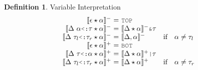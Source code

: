 \documentclass[acmsmall]{acmart}
\theoremstyle{definition}
\newtheorem{definition}{Definition}[section]
\begin{document}


\begin{definition} 
  \label{def:variable_interpretation}
  Variable Interpretation
  \hfill
  \boxed{
    \llbracket\Delta \star \alpha \rrbracket^\pm = \tau
  }
  \\
  \[
  \begin{array}[t]{r@{}c@{}lcl}

      \llbracket \epsilon \star \alpha \rrbracket^-
      &\ =\ & 
      \J{TOP}

      \\

      \llbracket \Delta \ \alpha  \J{<:} \tau \star \alpha \rrbracket^- 
      &\ =\ & 
      \llbracket \Delta \star \alpha \rrbracket^- \J{\&} \tau

      \\

      \llbracket \Delta \ \tau_l \J{<:} \tau_r \star \alpha \rrbracket^- 
      &\ =\ & 
      \llbracket \Delta, \alpha \rrbracket^-
      &\text{if}& 
      \begin{array}[t]{@{}l}
        \alpha \neq \tau_l
      \end{array}

      \\

      \llbracket \epsilon \star \alpha \rrbracket^+ 
      &\ =\ & 
      \J{BOT}

      \\

      \llbracket \Delta \  \tau \J{<:} \alpha \star \alpha \rrbracket^+ 
      &\ =\ & 
      \llbracket \Delta \star \alpha \rrbracket^+ \J{|} \tau

      \\

      \llbracket \Delta \ \tau_l \J{<:} \tau_r \star \alpha \rrbracket^+ 
      &\ =\ & 
      \llbracket \Delta \star \alpha \rrbracket^+
      &\text{if}& 
      \begin{array}[t]{@{}l}
        \alpha \neq \tau_r
      \end{array}
  \end{array}
  \]
\end{definition}
\end{document}
